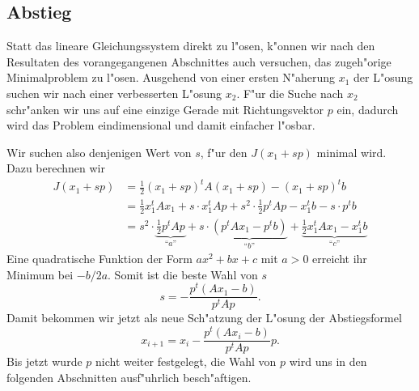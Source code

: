 \subsection{Abstieg}
Statt das lineare Gleichungssystem direkt zu l"osen, k"onnen wir nach
den Resultaten des vorangegangenen Abschnittes
auch versuchen, das zugeh"orige Minimalproblem zu l"osen. 
Ausgehend von einer ersten N"aherung $x_1$ der L"osung suchen wir nach einer 
verbesserten L"osung $x_2$.
F"ur die Suche nach $x_2$ 
schr"anken wir uns auf eine einzige Gerade mit Richtungsvektor $p$
ein, dadurch wird das Problem eindimensional und damit einfacher l"osbar.

Wir suchen also denjenigen Wert von $s$, f"ur den $J(x_1+sp)$ minimal
wird. Dazu berechnen wir
\begin{align*}
J(x_1+sp)
&=
\frac12(x_1+sp)^tA(x_1+sp)-(x_1+sp)^tb\\
&=
\frac12 x_1^tAx_1 +s\cdot x_1^tAp +s^2\cdot \frac12 p^tAp-x_1^tb - s\cdot p^t b
\\
&=s^2\cdot \underbrace{\frac12 p^tAp}_{\text{``$a$''}} + s\cdot \underbrace{(p^tAx_1-p^tb)}_{\text{``$b$''}} +\underbrace{\frac12 x_1^tAx_1 -x_1^tb}_{\text{``$c$''}}
\end{align*}
Eine quadratische Funktion der Form $ax^2+bx+c$ mit $a>0$ erreicht ihr
Minimum bei $-b/2a$. Somit ist die beste Wahl von $s$
\[
s=-\frac{p^t(Ax_1-b)}{p^tAp}.
\]
Damit bekommen wir jetzt als neue Sch"atzung der L"osung 
der Abstiegsformel
\begin{equation}
x_{i+1}=x_i-\frac{p^t(Ax_i-b)}{p^tAp} p.
\label{descent:main}
\end{equation}
Bis jetzt wurde $p$ nicht weiter festgelegt, die Wahl von $p$ wird uns
in den folgenden Abschnitten ausf"uhrlich besch"aftigen.

